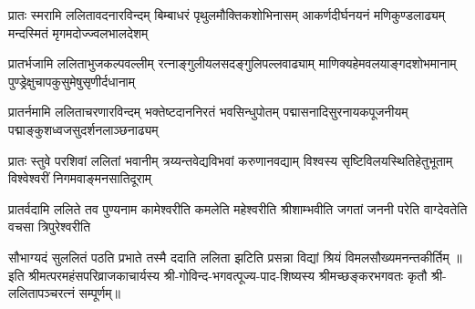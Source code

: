 
\fourlineindentedshloka
{प्रातः स्मरामि ललितावदनारविन्दम्}
{बिम्बाधरं पृथुलमौक्तिकशोभिनासम्}
{आकर्णदीर्घनयनं मणिकुण्डलाढ्यम्}
{मन्दस्मितं मृगमदोज्ज्वलभालदेशम्}

\fourlineindentedshloka
{प्रातर्भजामि ललिताभुजकल्पवल्लीम्}
{रत्नाङ्गुलीयलसदङ्गुलिपल्लवाढ्याम्}
{माणिक्यहेमवलयाङ्गदशोभमानाम्}
{पुण्ड्रेक्षुचापकुसुमेषुसृणीर्दधानाम्}

\fourlineindentedshloka
{प्रातर्नमामि ललिताचरणारविन्दम्}
{भक्तेष्टदाननिरतं भवसिन्धुपोतम्}
{पद्मासनादिसुरनायकपूजनीयम्}
{पद्माङ्कुशध्वजसुदर्शनलाञ्छनाढ्यम्}

\fourlineindentedshloka
{प्रातः स्तुवे परशिवां ललितां भवानीम्}
{त्रय्यन्तवेद्यविभवां करुणानवद्याम्}
{विश्वस्य सृष्टिविलयस्थितिहेतुभूताम्}
{विश्वेश्वरीं निगमवाङ्मनसातिदूराम्}

\fourlineindentedshloka
{प्रातर्वदामि ललिते तव पुण्यनाम}
{कामेश्वरीति कमलेति महेश्वरीति}
{श्रीशाम्भवीति जगतां जननी परेति}
{वाग्देवतेति वचसा त्रिपुरेश्वरीति}

{सौभाग्यदं सुललितं पठति प्रभाते}
{तस्मै ददाति ललिता झटिति प्रसन्ना}
{विद्यां श्रियं विमलसौख्यमनन्तकीर्तिम्}
॥इति श्रीमत्परमहंसपरिव्राजकाचार्यस्य श्री-गोविन्द-भगवत्पूज्य-पाद-शिष्यस्य 
श्रीमच्छङ्करभगवतः कृतौ  श्री-ललितापञ्चरत्नं सम्पूर्णम्॥